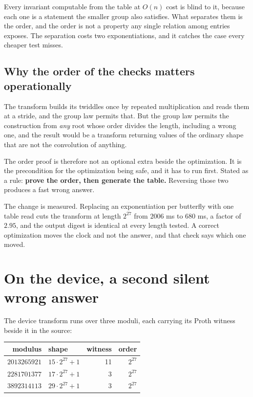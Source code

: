 Every invariant computable from the table at \(O(n)\) cost is blind to it, because each one is a statement the smaller group also satisfies. What separates them is the order, and the order is not a property any single relation among entries exposes. The separation costs two exponentiations, and it catches the case every cheaper test misses.

\subsection{Why the order of the checks matters operationally}

The transform builds its twiddles once by repeated multiplication and reads them at a stride, and the group law permits that. But the group law permits the construction from \emph{any} root whose order divides the length, including a wrong one, and the result would be a transform returning values of the ordinary shape that are not the convolution of anything.

The order proof is therefore not an optional extra beside the optimization. It is the precondition for the optimization being safe, and it has to run first. Stated as a rule: \textbf{prove the order, then generate the table.} Reversing those two produces a fast wrong answer.

The change is measured. Replacing an exponentiation per butterfly with one table read cuts the transform at length \(2^{27}\) from \(2006\) ms to \(680\) ms, a factor of \(2.95\), and the output digest is identical at every length tested. A correct optimization moves the clock and not the answer, and that check says which one moved.

\section{On the device, a second silent wrong answer}

The device transform runs over three moduli, each carrying its Proth witness beside it in the source:

\begin{center}
\begin{tabular}{@{}rlrr@{}}
\toprule
modulus & shape & witness & order \\
\midrule
\(2013265921\) & \(15 \cdot 2^{27} + 1\) & 11 & \(2^{27}\) \\
\(2281701377\) & \(17 \cdot 2^{27} + 1\) & 3 & \(2^{27}\) \\
\(3892314113\) & \(29 \cdot 2^{27} + 1\) & 3 & \(2^{27}\) \\
\bottomrule
\end{tabular}
\end{center}

